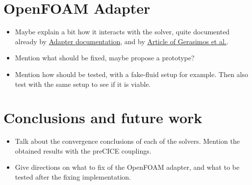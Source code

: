 \documentclass[
  english,        %
  font=times,     %
  onecolumn,      %
]{tumarticle}
\begin{document}
\section{OpenFOAM Adapter}
\begin{itemize}
    \item Maybe explain a bit how it interacts with the solver, quite documented already by \href{https://precice.org/adapter-openfoam-extend.html}{Adapter documentation}, and by \href{https://journal.openfoam.com/index.php/ofj/article/view/88/78}{Article of Gerasimos et al.}.
    \item Mention what should be fixed, maybe propose a prototype?
    \item Mention how should be tested, with a fake-fluid setup for example. Then also test with the same setup to see if it is viable.
\end{itemize}

\section{Conclusions and future work}
\begin{itemize}
    \item Talk about the convergence conclusions of each of the solvers. Mention the obtained results with the preCICE couplings.
    \item Give directions on what to fix of the OpenFOAM adapter, and what to be tested after the fixing implementation.

\end{itemize}

\printbibliography
\end{document}
